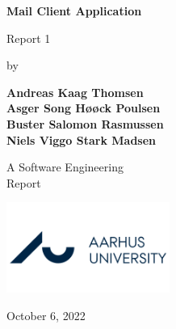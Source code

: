 \newcommand{\norm}[1]{\left\lVert#1\right\rVert}     
\newcommand\course{Software Engineering}        %
\newcommand\hwnumber{1}                                   %
\newcommand\Information{XXX/xxxxxxxx}                     %
\begin{titlepage}
    \begin{center}
        \vspace*{3cm}
            
        \Huge
        \textbf{Mail Client Application}
            
        \vspace{1cm}
        \huge
        Report \hwnumber{}
            
        \vspace{1.5cm}
        \Large
        by
        
        \textbf{Andreas Kaag Thomsen}\\ %
        \textbf{Asger Song Høøck Poulsen}\\ %
        \textbf{Buster Salomon Rasmussen}\\ %
        \textbf{Niels Viggo Stark Madsen} %
        
            
        \vfill
        
        A \course{} \\Report
            
        \vspace{0.5cm}
            
        \includegraphics[width=0.4\textwidth]{img/aarhus-university.png}
        \\
        
        \Large
        
        October 6, 2022
            
    \end{center}
\end{titlepage}
